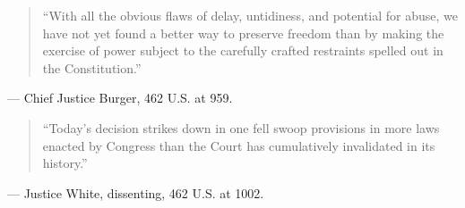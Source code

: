 \documentclass[12pt]{article}
\begin{document}
\begin{quote}
``With all the obvious flaws of delay, untidiness, and potential for abuse, we have not yet found a better way to preserve freedom than by making the exercise of power subject to the carefully crafted restraints spelled out in the Constitution.''
\end{quote}
\noindent --- Chief Justice Burger, 462 U.S. at 959.

\begin{quote}
``Today's decision strikes down in one fell swoop provisions in more laws enacted by Congress than the Court has cumulatively invalidated in its history.''
\end{quote}
\noindent --- Justice White, dissenting, 462 U.S. at 1002.
\end{document}

